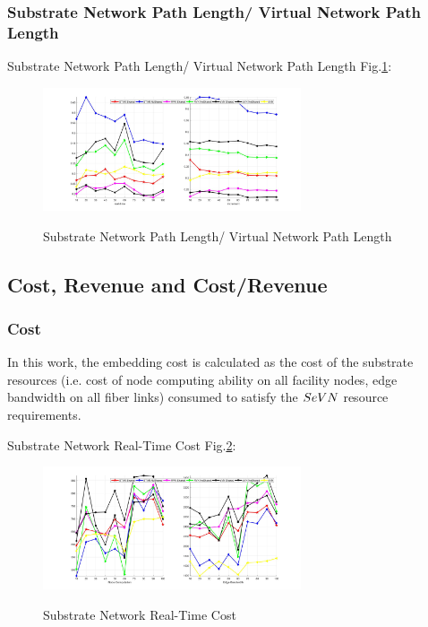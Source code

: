\subsubsection{Substrate Network Path Length/ Virtual Network Path Length}


Substrate Network Path Length/ Virtual Network Path Length Fig.\ref{fig:PathLengthSubVir2VirNet}:
\begin{figure}[htbp]
  \centering
  \includegraphics[width=3in]{Fig/PathLengthSubVir2VirNet}\\
  \caption{Substrate Network Path Length/ Virtual Network Path Length }\label{fig:PathLengthSubVir2VirNet}
\end{figure}



\subsection{Cost, Revenue and Cost/Revenue}
\subsubsection{Cost}
In this work, the embedding cost is calculated as the cost of the substrate resources (i.e. cost of node computing ability on all facility nodes, edge bandwidth on all fiber links) consumed to satisfy the $SeVN$ resource requirements.

Substrate Network Real-Time Cost Fig.\ref{fig:CostCurrentSubstrateNetwork}:
\begin{figure}[htbp]
  \centering
  \includegraphics[width=3in]{Fig/CostCurrentSubstrateNetwork}\\
  \caption{Substrate Network Real-Time Cost}\label{fig:CostCurrentSubstrateNetwork}
\end{figure}

